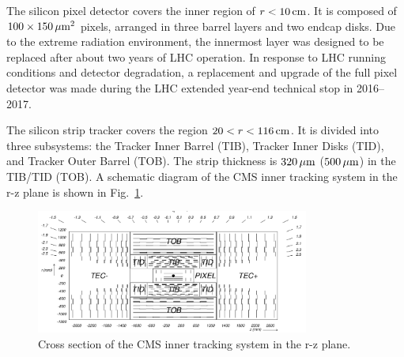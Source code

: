 The silicon pixel detector covers the inner region of $r < 10 \,\text{cm}$. It is composed of $100 \times 150 \,\mu\text{m}^{2}$ pixels, arranged in three barrel layers and two endcap disks. Due to the extreme 
radiation environment, the innermost layer was designed to be replaced after about two years of LHC operation. 
In response to LHC running conditions and detector degradation, a replacement and upgrade of the full pixel detector was made during the LHC extended year-end technical stop in 2016--2017. 

The silicon strip tracker covers the region $20 < r < 116 \,\text{cm}$. It is divided into three subsystems: the Tracker Inner Barrel (TIB), Tracker Inner Disks (TID), and Tracker Outer Barrel (TOB). 
The strip thickness is $320 \,\mu\text{m}$ ($500 \,\mu\text{m}$) in the TIB/TID (TOB). A schematic diagram of the CMS inner tracking system in the r-z plane is shown in Fig.~\ref{fig:cms_tracker}.

\begin{figure}[tb]
  \centering
   \includegraphics[width=0.8\textwidth]{fig/experiment/detector/cms_tracker.png}
	\caption[Cross section of the CMS inner tracking system in the r-z plane.]{Cross section of the CMS inner tracking system in the r-z plane.~\cite{CMS:2008xjf}}
	\label{fig:cms_tracker}
\end{figure}


